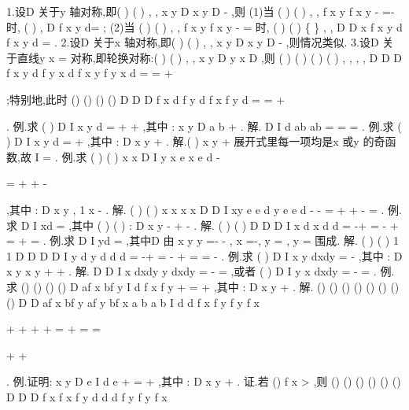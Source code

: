 1.设D 关于y 轴对称,即(
)
(
)
,
,
x y
D
x y
D
\in 
\Rightarrow -
\in 
,则 
(1)当
(
)
(
)
,
,
f
x y
f x y
-
=-
时,
(
)
,
D
f x y d\sigma =
\int \int 
; 
(2)当
(
)
(
)
,
,
f
x y
f x y
-
=
时,
(
)
(
)
\{
\}
,
,
D
D
x
f x y d
f x y d
\sigma 
\sigma 
\cap 
\ge 
=
\int \int 
\int \int 
. 
2.设D 关于x 轴对称,即(
)
(
)
,
,
x y
D
x
y
D
\in 
\Rightarrow 
-
\in 
,则情况类似. 
3.设D 关于直线y
x
=
对称,即轮换对称:(
)
(
)
,
,
x y
D
y x
D
\in 
\Rightarrow 
\in 
,则 
(
)
(
)
(
)
(
)
,
,
,
,
D
D
D
f x y d
f
y x d
f x y
f
y x
d
\sigma 
\sigma 
\sigma 
=
=
+




\int \int 
\int \int 
\int \int 
;特别地,此时 
()
()
()
()
D
D
D
f x d
f
y d
f x
f
y
d
\sigma 
\sigma 
\sigma 
=
=
+




\int \int 
\int \int 
\int \int 
. 
\textcolor{lyred}{例}.求
(
)
D
I
x
y
d\sigma 
=
+
+
\int \int 
,其中
:
x
y
D a
b
+
\le . 
解.
D
I
d
ab
ab
\sigma 
\pi 
\pi 
=
=
=
\int \int 
. 
\textcolor{lyred}{例}.求
(
)
D
I
x
y
d\sigma 
=
+
\int \int 
,其中
:
D x
y
+
\le . 
解.(
)
x
y
+
展开式里每一项均是x 或y 的奇函数,故
I =
. 
\textcolor{lyred}{例}.求
(
)
(
)
x
x
D
I
y
x
e
x
e
d\sigma 
-


=
+
+
-


\int \int 
,其中
:
D x
y
\le 
\le , 1
x
-\le 
\le . 
解.
(
)
(
)
x
x
x
x
D
D
I
xy e
e
d
y e
e
d
\sigma 
\sigma 
-
-
=
+
+
-
=
\int \int 
\int \int 
. 
\textcolor{lyred}{例}.求
D
I
xd\sigma 
=\int \int 
,其中
(
)
(
)
:
D
x
y
-
+
-
\le . 
解.
(
)
(
)
D
D
D
I
x
d
x
d
d
\sigma 
\sigma 
\sigma 
\pi 
\pi 
=
-+
=
-
+
=
+
=
\int \int 
\int \int 
\int \int 
. 
\textcolor{lyred}{例}.求
D
I
yd\sigma 
=\int \int 
,其中D 由
x
y
y
=-
-
,
x =-,
y =
,
y =
围成. 
解.
(
)
(
)
1 1
D
D
D
D
I
y
d
y
d
d
d
\pi 
\sigma 
\sigma 
\sigma 
\sigma 
=
-+
=
-
+
=
=
-
\int \int 
\int \int 
\int \int 
\int \int 
. 
\textcolor{lyred}{例}.求
(
)
D
I
x
y
dxdy
=
-
\int \int 
,其中
:
D x
y
x
y
+
\le 
+
. 
解.
D
D
I
x dxdy
y dxdy
=
-
=
\int \int 
\int \int 
,或者
(
)
D
I
y
x
dxdy
=
-
=
\int \int 
. 
\textcolor{lyred}{例}.求
()
()
()
()
D
af x
bf
y
I
d
f x
f
y
\sigma 
+
=
+
\int \int 
,其中
:
D x
y
+
\le . 
解.
()
()
()
()
()
()
()
()
D
D
af x
bf
y
af
y
bf x
a
b
a
b
I
d
d
f x
f
y
f
y
f x
\sigma 
\sigma 
\pi 


+
+
+
+
=
+
=
=


+
+


\int \int 
\int \int 
. 
\textcolor{lyred}{例}.证明:
x
y
D
e
I
d
e
\sigma 
\pi 
+
=
\ge 
+
\int \int 
,其中
:
D x
y
+
\le . 
证.若
()
f x >
,则
()
()
()
()
()
()
D
D
D
f x
f x
f
y
d
d
d
f
y
f
y
f x
\sigma 
\sigma 
\sigma 


